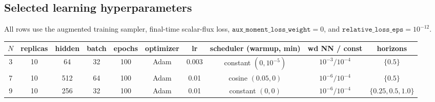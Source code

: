 \documentclass[10pt]{article}
\begin{document}
\subsection*{Selected learning hyperparameters}
All rows use the augmented training sampler, final-time scalar-flux loss,
\(\texttt{aux\_moment\_loss\_weight}=0\), and
\(\texttt{relative\_loss\_eps}=10^{-12}\).
\begin{center}
{\scriptsize
\begin{tabular}{c c c c c c c c c c}
\toprule
\(N\) & replicas & hidden & batch & epochs & optimizer & lr & scheduler (warmup, min) & wd NN / const & horizons \\
\midrule
3 & 10 & 64 & 32 & 100 & Adam & 0.003 & constant \((0,10^{-5})\) & \(10^{-3}/10^{-4}\) & \(\{0.5\}\) \\
7 & 10 & 512 & 64 & 100 & Adam & 0.01 & cosine \((0.05,0)\) & \(10^{-6}/10^{-4}\) & \(\{0.5\}\) \\
9 & 10 & 256 & 32 & 100 & Adam & 0.01 & constant \((0,0)\) & \(10^{-6}/10^{-4}\) & \(\{0.25,0.5,1.0\}\) \\
\bottomrule
\end{tabular}
}
\end{center}
\end{document}
